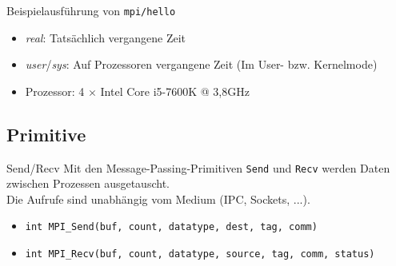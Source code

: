 \documentclass{beamer}
\begin{document}
\begin{frame}{Beispielausführung von \texttt{mpi/hello}}
  \begin{figure}
    
  \end{figure}

  \begin{itemize}
    \item \emph{real}: Tatsächlich vergangene Zeit
    \item \emph{user}/\emph{sys}: Auf Prozessoren vergangene Zeit {\tiny (Im User- bzw. Kernelmode)}
	\pause
    \item Prozessor: 4 $\times$ Intel Core i5-7600K @ 3,8GHz
  \end{itemize}
\end{frame}

\subsection{Primitive}


\begin{frame}{Send/Recv}
	Mit den Message-Passing-Primitiven \texttt{Send} und \texttt{Recv} werden Daten zwischen Prozessen ausgetauscht.\\
	Die Aufrufe sind unabhängig vom Medium (IPC, Sockets, ...).

	\begin{figure}
	\end{figure}

	\begin{itemize}
		\item {\footnotesize \texttt{int MPI\_Send(buf, count, datatype, dest, tag, comm)}}
		\item {\footnotesize \texttt{int MPI\_Recv(buf, count, datatype, source, tag, comm, status)}}
	\end{itemize}
\end{frame}
\end{document}

